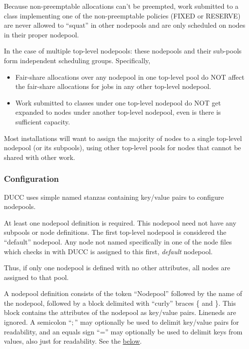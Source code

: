     Because non-preemptable allocations can't be preempted, work submitted to a class
    implementing one of the non-preemptable policies (FIXED or RESERVE) are never allowed
    to ``squat'' in other nodepools and are only scheduled on nodes in their
    proper nodepool.

    In the case of multiple top-level nodepools: these nodepools and their sub-pools
    form independent scheduling groups.  Specifically,
    \begin{itemize}
        \item Fair-share allocations over any nodepool in one top-level pool do NOT affect the
          fair-share allocations for jobs in any other top-level nodepool. 

        \item Work submitted to classes under one top-level nodepool do NOT get expanded to
          nodes under another top-level nodepool, even is there is sufficient capacity.
    \end{itemize}

    Most installations will want to assign the majority of nodes to a single top-level
    nodepool (or its subpools), using other top-level pools for nodes that cannot be
    shared with other work.

\subsubsection{Configuration}
\label{subsubsec:nodepool.configuration}
    DUCC uses simple named stanzas containing key/value pairs to configure nodepools.

    At least one nodepool definition is required.  This nodepool need not have any subpools or node
    definitions.  The first top-level nodepool is considered the ``default'' nodepool.  Any node not
    named specifically in one of the node files which checks in with DUCC is assigned to this
    first, {\em default} nodepool. 

    Thus, if only one nodepool is defined with no other attributes, all nodes are
    assigned to that pool.

    A nodepool definition consists of the token ``Nodepool'' followed by the 
    name of the nodepool, followed by a block delimited with ``curly'' braces \{ and \}.  This
    block contains the attributes of the nodepool as key/value pairs.
    Lineneds are ignored.  A semicolon ``$;$'' may optionally be used to
    delimit key/value pairs for readability, and an equals sign ``='' may optionally
    be used to delimit keys from values, also just for readability.  See the 
    \hyperref[fig:nodepool.configuration]{below}.

